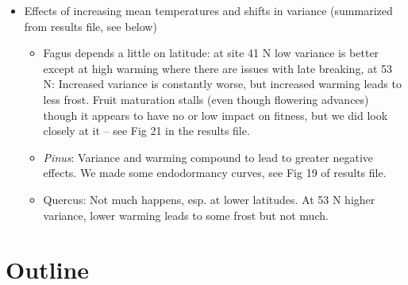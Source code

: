 \documentclass[11pt,letter]{article}
\begin{document}
\begin{itemize}
\begin{itemize}
\item \emph{Quercus} is not changing much but does see some frost losses at higher variance.
\end{itemize}
\item Effects of increasing mean temperatures and shifts in variance (summarized from results file, see below)
\begin{itemize}
\item Fagus depends a little on latitude: at site 41 N low variance is better except at high warming where there are issues with late breaking, at 53 N: Increased variance is constantly worse, but increased warming leads to less frost. Fruit maturation stalls (even though flowering advances) though it appears to have no or low impact on fitness, but we did look closely at it -- see Fig 21 in the results file.  
\item \emph{Pinus}: Variance and warming compound to lead to greater negative effects. We made some endodormancy curves, see Fig 19 of results file. 
\item Quercus: Not much happens, esp. at lower latitudes. At 53 N higher variance, lower warming leads to some frost but not much.
\end{itemize}
\end{itemize}


\newpage
\section{Outline}
\end{document}
